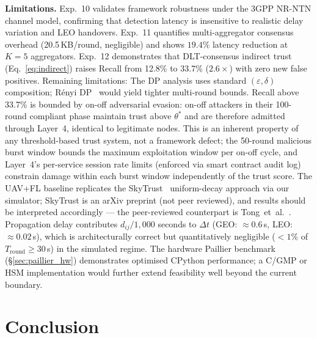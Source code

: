 \documentclass[journal,twoside,10pt]{IEEEtran}
\begin{document}
\textbf{Limitations.}
Exp.~10 validates framework robustness under the 3GPP NR-NTN channel model,
confirming that detection latency is insensitive to realistic delay variation
and LEO handovers.
Exp.~11 quantifies multi-aggregator consensus overhead (20.5\,KB/round, negligible)
and shows $19.4\%$ latency reduction at $K\!=\!5$ aggregators.
Exp.~12 demonstrates that DLT-consensus indirect trust (Eq.~\eqref{eq:indirect})
raises Recall from 12.8\% to 33.7\% ($2.6\times$) with zero new false positives.
Remaining limitations:
The DP analysis uses standard $(\varepsilon,\delta)$ composition;
R\'{e}nyi DP~\cite{mironov2017} would yield tighter multi-round bounds.
Recall above 33.7\% is bounded by on-off adversarial evasion:
on-off attackers in their 100-round compliant phase maintain trust
above $\theta^*$ and are therefore admitted through Layer~4, identical
to legitimate nodes.
This is an inherent property of any threshold-based trust system, not
a framework defect; the 50-round malicious burst window bounds the
maximum exploitation window per on-off cycle, and Layer~4's
per-service session rate limits (enforced via smart contract audit log)
constrain damage within each burst window independently of the trust score.
The UAV+FL baseline replicates the SkyTrust~\cite{uav_fl} uniform-decay
approach via our simulator; SkyTrust is an arXiv preprint (not peer
reviewed), and results should be interpreted accordingly --- the
peer-reviewed counterpart is Tong~et~al.~\cite{tong2024}.
Propagation delay contributes $d_{ij}/1{,}000$ seconds to $\Delta t$
(GEO: ${\approx}0.6$\,s, LEO: ${\approx}0.02$\,s), which is
architecturally correct but quantitatively negligible ($<1\%$ of
$T_{\mathrm{round}}\!\geq\!30$\,s) in the simulated regime.
The hardware Paillier benchmark (\S\ref{sec:paillier_hw}) demonstrates
optimised CPython performance; a C/GMP or HSM implementation would further
extend feasibility well beyond the current boundary.

\section{Conclusion}
\label{sec:conclusion}
\end{document}
